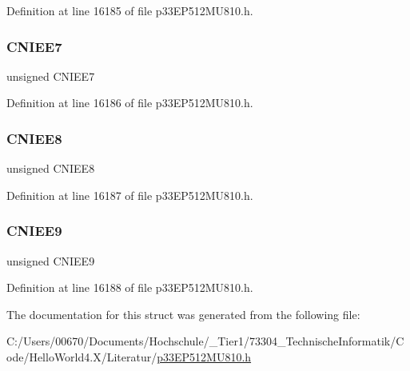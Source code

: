 Definition at line 16185 of file p33\+E\+P512\+M\+U810.\+h.

\mbox{\label{structtag_c_n_e_n_e_b_i_t_s_a8ebd9611b7c129ed6a1ac88999b6dc7b}} 
\subsubsection{\texorpdfstring{C\+N\+I\+E\+E7}{CNIEE7}}
{\footnotesize\ttfamily unsigned C\+N\+I\+E\+E7}



Definition at line 16186 of file p33\+E\+P512\+M\+U810.\+h.

\mbox{\label{structtag_c_n_e_n_e_b_i_t_s_ac198df4151894d8c55d6587da47da374}} 
\subsubsection{\texorpdfstring{C\+N\+I\+E\+E8}{CNIEE8}}
{\footnotesize\ttfamily unsigned C\+N\+I\+E\+E8}



Definition at line 16187 of file p33\+E\+P512\+M\+U810.\+h.

\mbox{\label{structtag_c_n_e_n_e_b_i_t_s_a9cc9f4b97de000524ec76dbc7fbf3619}} 
\subsubsection{\texorpdfstring{C\+N\+I\+E\+E9}{CNIEE9}}
{\footnotesize\ttfamily unsigned C\+N\+I\+E\+E9}



Definition at line 16188 of file p33\+E\+P512\+M\+U810.\+h.



The documentation for this struct was generated from the following file\+:\begin{DoxyCompactItemize}
\item 
C\+:/\+Users/00670/\+Documents/\+Hochschule/\+\_\+\+Tier1/73304\+\_\+\+Technische\+Informatik/\+Code/\+Hello\+World4.\+X/\+Literatur/\hyperlink{p33_e_p512_m_u810_8h}{p33\+E\+P512\+M\+U810.\+h}\end{DoxyCompactItemize}
